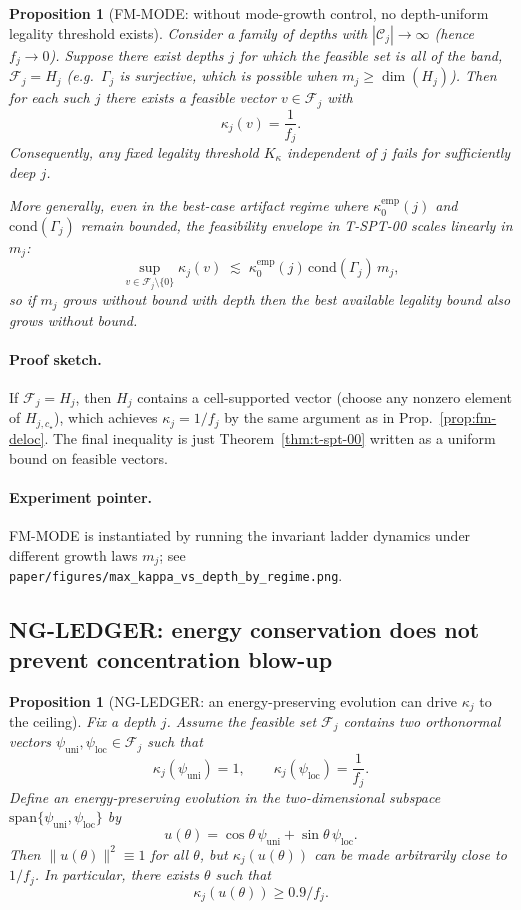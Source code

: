 \documentclass[11pt]{article}
\newtheorem{proposition}[definition]{Proposition}
\begin{document}
\begin{proposition}[FM-MODE: without mode-growth control, no depth-uniform legality threshold exists]\label{prop:fm-mode}
Consider a family of depths with $|\mathcal{C}_j|\to\infty$ (hence $f_j\to 0$).
Suppose there exist depths $j$ for which the feasible set is all of the band, $\mathcal{F}_j=H_j$ (e.g.\ $\Gamma_j$ is surjective, which is possible when $m_j\ge \dim(H_j)$).
Then for each such $j$ there exists a feasible vector $v\in\mathcal{F}_j$ with
\[
\kappa_j(v)=\frac{1}{f_j}.
\]
Consequently, any fixed legality threshold $K_\kappa$ independent of $j$ fails for sufficiently deep $j$.

More generally, even in the best-case artifact regime where $\kappa^{\mathrm{emp}}_0(j)$ and $\mathrm{cond}(\Gamma_j)$ remain bounded, the feasibility envelope in T-SPT-00 scales linearly in $m_j$:
\[
\sup_{v\in\mathcal{F}_j\setminus\{0\}}\kappa_j(v)
\;\lesssim\;
\kappa^{\mathrm{emp}}_0(j)\,\mathrm{cond}(\Gamma_j)\,m_j,
\]
so if $m_j$ grows without bound with depth then the best available legality bound also grows without bound.
\end{proposition}

\paragraph{Proof sketch.}
If $\mathcal{F}_j=H_j$, then $H_j$ contains a cell-supported vector (choose any nonzero element of $H_{j,c_\star}$), which achieves $\kappa_j=1/f_j$ by the same argument as in Prop.~\ref{prop:fm-deloc}.
The final inequality is just Theorem~\ref{thm:t-spt-00} written as a uniform bound on feasible vectors.

\paragraph{Experiment pointer.}
FM-MODE is instantiated by running the invariant ladder dynamics under different growth laws $m_j$; see \nolinkurl{paper/figures/max_kappa_vs_depth_by_regime.png}.

\subsection{NG-LEDGER: energy conservation does not prevent concentration blow-up}

\begin{proposition}[NG-LEDGER: an energy-preserving evolution can drive $\kappa_j$ to the ceiling]\label{prop:ng-ledger}
Fix a depth $j$.
Assume the feasible set $\mathcal{F}_j$ contains two orthonormal vectors $\psi_{\mathrm{uni}},\psi_{\mathrm{loc}}\in \mathcal{F}_j$ such that
\[
\kappa_j(\psi_{\mathrm{uni}})=1,
\qquad
\kappa_j(\psi_{\mathrm{loc}})=\frac{1}{f_j}.
\]
Define an energy-preserving evolution in the two-dimensional subspace $\mathrm{span}\{\psi_{\mathrm{uni}},\psi_{\mathrm{loc}}\}$ by
\[
u(\theta)=\cos\theta\,\psi_{\mathrm{uni}}+\sin\theta\,\psi_{\mathrm{loc}}.
\]
Then $\|u(\theta)\|^2\equiv 1$ for all $\theta$, but $\kappa_j(u(\theta))$ can be made arbitrarily close to $1/f_j$.
In particular, there exists $\theta$ such that
\[
\kappa_j(u(\theta)) \ge 0.9/f_j.
\]
\end{proposition}
\end{document}
